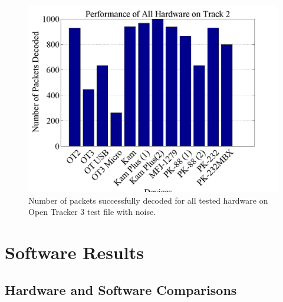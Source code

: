  \begin{figure}
  \centering
	\includegraphics[width=0.75\linewidth]{images/PerformanceofAllHardwareonTrack2.png} 
	\caption{Number of packets successfully decoded for all tested hardware on Open Tracker 3 test file with noise.}
   \label{allHardwareTrack2}
\end{figure}

\section{Software Results}

\subsection{Hardware and Software Comparisons}

